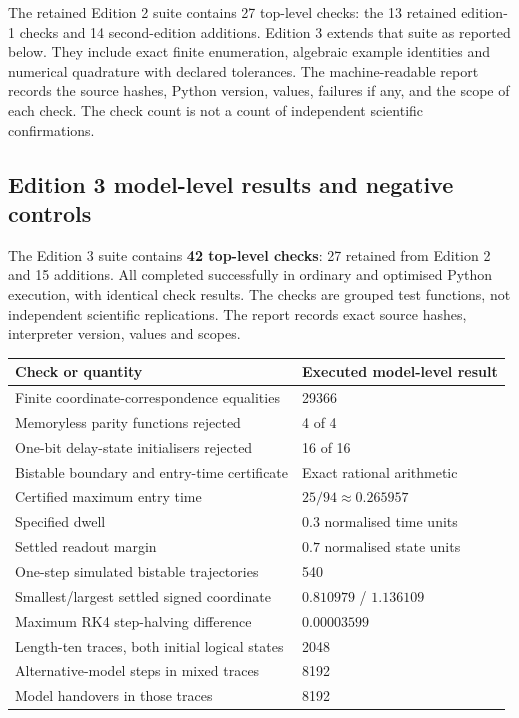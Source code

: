 \documentclass[11pt,a4paper]{article}
\theoremstyle{definition}
\theoremstyle{remark}
\begin{document}
The retained Edition 2 suite contains 27 top-level checks: the 13 retained edition-1 checks and 14 second-edition additions. Edition 3 extends that suite as reported below. They include exact finite enumeration, algebraic example identities and numerical quadrature with declared tolerances. The machine-readable report records the source hashes, Python version, values, failures if any, and the scope of each check. The check count is not a count of independent scientific confirmations.

\subsection{Edition 3 model-level results and negative controls}
The Edition 3 suite contains \textbf{42 top-level checks}: 27 retained from Edition 2 and 15 additions. All completed successfully in ordinary and optimised Python execution, with identical check results. The checks are grouped test functions, not independent scientific replications. The report records exact source hashes, interpreter version, values and scopes.

\begin{center}\small
\begin{tabular}{@{}p{}p{}@{}}\toprule
Check or quantity & Executed model-level result\\\midrule
Finite coordinate-correspondence equalities & 29366\\
Memoryless parity functions rejected & 4 of 4\\
One-bit delay-state initialisers rejected & 16 of 16\\
Bistable boundary and entry-time certificate & Exact rational arithmetic\\
Certified maximum entry time & $25/94\approx0.265957$\\
Specified dwell & $0.3$ normalised time units\\
Settled readout margin & $0.7$ normalised state units\\
One-step simulated bistable trajectories & 540\\
Smallest/largest settled signed coordinate & $0.810979$ / $1.136109$\\
Maximum RK4 step-halving difference & $0.00003599$\\
Length-ten traces, both initial logical states & 2048\\
Alternative-model steps in mixed traces & 8192\\
Model handovers in those traces & 8192\\\bottomrule
\end{tabular}
\end{center}
\end{document}
